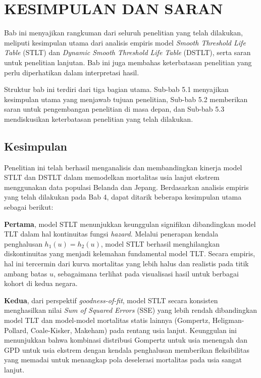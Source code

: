 \chapter{KESIMPULAN DAN SARAN}

Bab ini menyajikan rangkuman dari seluruh penelitian yang telah dilakukan, meliputi kesimpulan utama dari analisis empiris model \textit{Smooth Threshold Life Table} (STLT) dan \textit{Dynamic Smooth Threshold Life Table} (DSTLT), serta saran untuk penelitian lanjutan. Bab ini juga membahas keterbatasan penelitian yang perlu diperhatikan dalam interpretasi hasil.

Struktur bab ini terdiri dari tiga bagian utama. Sub-bab 5.1 menyajikan kesimpulan utama yang menjawab tujuan penelitian, Sub-bab 5.2 memberikan saran untuk pengembangan penelitian di masa depan, dan Sub-bab 5.3 mendiskusikan keterbatasan penelitian yang telah dilakukan.

\section{Kesimpulan}

Penelitian ini telah berhasil menganalisis dan membandingkan kinerja model STLT dan DSTLT dalam memodelkan mortalitas usia lanjut ekstrem menggunakan data populasi Belanda dan Jepang. Berdasarkan analisis empiris yang telah dilakukan pada Bab 4, dapat ditarik beberapa kesimpulan utama sebagai berikut:

\textbf{Pertama}, model STLT menunjukkan keunggulan signifikan dibandingkan model TLT dalam hal kontinuitas fungsi \textit{hazard}. Melalui penerapan kendala penghalusan $h_1(u) = h_2(u)$, model STLT berhasil menghilangkan diskontinuitas yang menjadi kelemahan fundamental model TLT. Secara empiris, hal ini tercermin dari kurva mortalitas yang lebih halus dan realistis pada titik ambang batas $u$, sebagaimana terlihat pada visualisasi hasil untuk berbagai kohort di kedua negara.

\textbf{Kedua}, dari perspektif \textit{goodness-of-fit}, model STLT secara konsisten menghasilkan nilai \textit{Sum of Squared Errors} (SSE) yang lebih rendah dibandingkan model TLT dan model-model mortalitas statis lainnya (Gompertz, Heligman-Pollard, Coale-Kisker, Makeham) pada rentang usia lanjut. Keunggulan ini menunjukkan bahwa kombinasi distribusi Gompertz untuk usia menengah dan GPD untuk usia ekstrem dengan kendala penghalusan memberikan fleksibilitas yang memadai untuk menangkap pola deselerasi mortalitas pada usia sangat lanjut.

